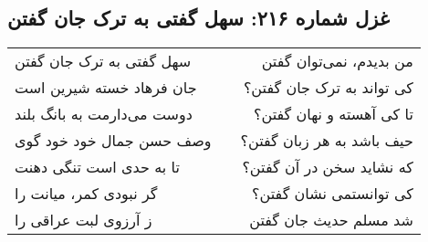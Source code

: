 \begin{center}
\section*{غزل شماره ۲۱۶: سهل گفتی به ترک جان گفتن}
\label{sec:216}
\begin{longtable}{l p{0.5cm} r}
سهل گفتی به ترک جان گفتن
&&
من بدیدم، نمی‌توان گفتن
\\
جان فرهاد خسته شیرین است
&&
کی تواند به ترک جان گفتن؟
\\
دوست می‌دارمت به بانگ بلند
&&
تا کی آهسته و نهان گفتن؟
\\
وصف حسن جمال خود خود گوی
&&
حیف باشد به هر زبان گفتن؟
\\
تا به حدی است تنگی دهنت
&&
که نشاید سخن در آن گفتن؟
\\
گر نبودی کمر، میانت را
&&
کی توانستمی نشان گفتن؟
\\
ز آرزوی لبت عراقی را
&&
شد مسلم حدیث جان گفتن
\\
\end{longtable}
\end{center}

